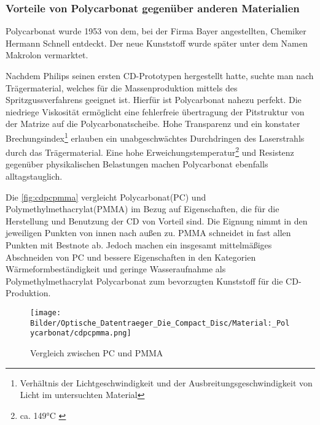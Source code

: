 \subsubsection{Vorteile von Polycarbonat gegenüber anderen Materialien}

Polycarbonat wurde 1953 von dem, bei der Firma Bayer angestellten, Chemiker
Hermann Schnell entdeckt. Der neue Kunststoff wurde später unter dem Namen
Makrolon\textsuperscript{\textregistered} vermarktet. \cite{cuzpc}

Nachdem Philips seinen ersten CD-Prototypen hergestellt hatte, suchte man nach
Trägermaterial, welches für die Massenproduktion mittels des
Spritzgussverfahrens geeignet ist. Hierfür ist Polycarbonat nahezu perfekt. Die
niedriege Viskosität ermöglicht eine fehlerfreie übertragung der Pitstruktur von
der Matrize auf die Polycarbonatscheibe. Hohe Transparenz und ein konstater
Brechungsindex\footnote{Verhältnis der Lichtgeschwindigkeit und der
Ausbreitungsgeschwindigkeit von Licht im untersuchten Material} erlauben ein
unabgeschwächtes Durchdringen des Laserstrahls durch das Trägermaterial. Eine
hohe Erweichungstemperatur\footnote{ca. 149°C \cite{cuzpc2}} und Resistenz
gegenüber physikalischen Belastungen machen Polycarbonat ebenfalls
alltagstauglich. \cite{cfcd}

Die \autoref{fig:cdpcpmma} vergleicht Polycarbonat(PC) und
Polymethylmethacrylat(PMMA) im Bezug auf Eigenschaften, die für die Herstellung
und Benutzung der CD von Vorteil sind. Die Eignung nimmt in den jeweiligen
Punkten von innen nach außen zu. PMMA schneidet in fast allen Punkten mit
Bestnote ab. Jedoch machen ein insgesamt mittelmäßiges Abschneiden von PC und
bessere Eigenschaften in den Kategorien Wärmeformbeständigkeit und geringe
Wasseraufnahme als Polymethylmethacrylat Polycarbonat zum bevorzugten Kunststoff
für die CD-Produktion.

\begin{figure}[h]
    \begin{center}
        \begin{minipage}[t]{\textwidth}
            \begin{center}
                \texttt{[image: Bilder/Optische\_Datentraeger\_Die\_Compact\_Disc/Material:\_Polycarbonat/cdpcpmma.png]}
                \caption[Vergleich zwischen PC und PMMA \newline Roth, Klaus: CD, DVD \& Co.: Die Chemie der schillernden Scheiben, in: Chemie in unserer Zeit (41/2007), S. 337]{Vergleich zwischen PC und PMMA}
                \label{fig:cdpcpmma}
            \end{center}
        \end{minipage}
    \end{center}
\end{figure}
